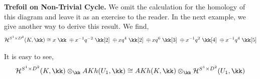 \documentclass{article}
\begin{document}
\begin{ex}{\textbf{Trefoil on Non-Trivial Cycle.}}
We omit the calculation for the homology of this diagram and leave it as an exercise to the reader. In the next example, we give another way to derive this result. We find, 
$$\mathcal{H}^{S^1\times D^2}(K,\kk) \cong x\hspace{1mm} \kk \hspace{1mm} \oplus x^{-1} q^{-2} \hspace{1mm} \kk[2]\hspace{1mm} \oplus x q^{4} \hspace{1mm} \kk[2]\hspace{1mm} \oplus x q^{6} \hspace{1mm} \kk[3]\hspace{1mm} \oplus  x^{-1} q^{2} \hspace{1mm} \kk[4]\hspace{1mm} \oplus x^{-1} q^{4} \hspace{1mm} \kk[5]$$

It is easy to see, 
$$\mathcal{H}^{S^1\times D^2}(K,\kk) \otimes_\kk AKh(U_1,\kk) \cong AKh(K,\kk) \otimes_\kk \mathcal{H}^{S^1\times D^2}(U_1,\kk)$$
\end{ex}
\end{document}
